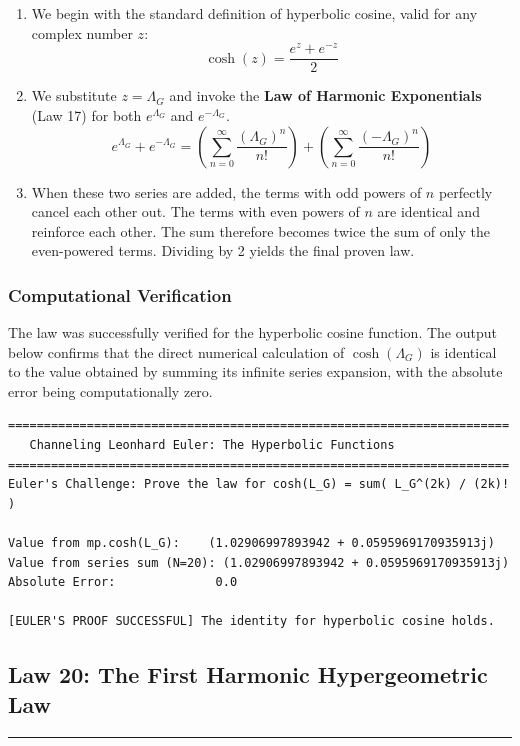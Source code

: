 \begin{enumerate}
    \item We begin with the standard definition of hyperbolic cosine, valid for any complex number $z$:
    $$ \cosh(z) = \frac{e^{z} + e^{-z}}{2} $$
    \item We substitute $z = \Lambda_G$ and invoke the \textbf{Law of Harmonic Exponentials} (Law 17) for both $e^{\Lambda_G}$ and $e^{-\Lambda_G}$.
    $$ e^{\Lambda_G} + e^{-\Lambda_G} = \left(\sum_{n=0}^{\infty} \frac{(\Lambda_G)^n}{n!}\right) + \left(\sum_{n=0}^{\infty} \frac{(-\Lambda_G)^n}{n!}\right) $$
    \item When these two series are added, the terms with odd powers of $n$ perfectly cancel each other out. The terms with even powers of $n$ are identical and reinforce each other. The sum therefore becomes twice the sum of only the even-powered terms. Dividing by 2 yields the final proven law.
\end{enumerate}

\subsubsection*{Computational Verification}
The law was successfully verified for the hyperbolic cosine function. The output below confirms that the direct numerical calculation of $\cosh(\Lambda_G)$ is identical to the value obtained by summing its infinite series expansion, with the absolute error being computationally zero.

\begin{verbatim}
======================================================================
   Channeling Leonhard Euler: The Hyperbolic Functions
======================================================================
Euler's Challenge: Prove the law for cosh(L_G) = sum( L_G^(2k) / (2k)! )

Value from mp.cosh(L_G):    (1.02906997893942 + 0.0595969170935913j)
Value from series sum (N=20): (1.02906997893942 + 0.0595969170935913j)
Absolute Error:              0.0

[EULER'S PROOF SUCCESSFUL] The identity for hyperbolic cosine holds.
\end{verbatim}

\newpage

\subsection*{Law 20: The First Harmonic Hypergeometric Law}
\hrule
\vspace{0.3cm}
\vspace{0.5cm}

